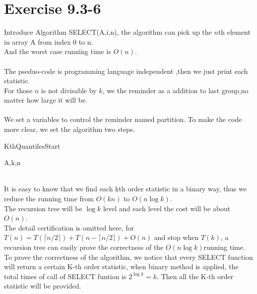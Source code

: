 \documentclass[oneside]{homework} %
\begin{document}
\maketitle
\newpage
\section*{Exercise 9.3-6}
Introduce Algorithm SELECT(A,i,n), the algorithm can pick up the  $n$th element in array A from index 0 to n.\\
And the worst case running time is $O(n)$. \\
\\ The pseduo-code is programming language independent ,then we just print each statistic.
\\ For those $n$ is not divisable by $k$, we the reminder as a addition to last group,no matter how large it will be.\\ 
\\ We set a variables to control the reminder named partition. To make the code more clear, we set the algorithm two steps.
  \begin{algorithm}[h]
  \caption{KthQuantilesStart}
  \label{algo:nlgkquantiles_start}
  \begin{algorithmic}[1]
	\REQUIRE A,k,n
	\ENSURE ~ ~\\ 
	  \ELSE
	  \ENDIF
	\LASTCON 	
  \end{algorithmic}
  \end{algorithm}
\\ It is easy to know that we find each kth order statistic in a binary way, thus we reduce the running time from $O(kn)$ to $O(n\log k)$.
\\ The recursion tree will be $\log k$ level and each level the cost will be about $O(n)$.
\\ The detail certification is omitted here, 
for $T(n) = T(\lceil n/2 \rceil ) + T(n-\lceil n/2 \rceil) + O(n) $ and stop when $T(k)$, a recursion tree can easily prove the correctness of the $O(n\log k)$running time.
\\ To prove the correctness of the algorithm, we notice that every SELECT function will return a certain K-th order statistic, when binary method is applied, the total times of call of SELECT funtion is $2^{\log k} = k$. Then all the K-th order statistic will be provided.
\end{document}
